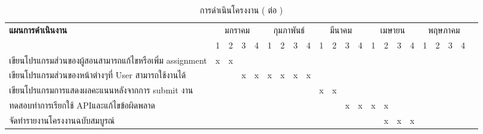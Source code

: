 \begin{landscape}
\begin{table}[h!]
\begin{threeparttable}
\begin{tabular}{|l|c|c|c|c|c|c|c|c|c|c|c|c|c|c|c|c|c|c|c|c|c|}
    \hline
    \multirow{2}{*}{\textbf{แผนการดำเนินงาน}}
    & \multicolumn{4}{c|}{มกราคม} 
    & \multicolumn{4}{c|}{กุมภาพันธ์} 
    & \multicolumn{4}{c|}{มีนาคม}
    & \multicolumn{4}{c|}{เมษายน}
    & \multicolumn{4}{c|}{พฤษภาคม}\\
    \cline{2-21}
    & 1 & 2 & 3 & 4
    & 1 & 2 & 3 & 4
    & 1 & 2 & 3 & 4
    & 1 & 2 & 3 & 4
    & 1 & 2 & 3 & 4\\
	\hline
    เขียนโปรแกรมส่วนของผู้สอนสามารถแก้ไขหรือเพิ่ม assignment &x&x&&&&&&&&&&&&&&&&&&\\
    \hline
    เขียนโปรแกรมส่วนของหน้าต่างๆที่ User สามารถใช้งานได้ &&&x&x&x&x&x&x&&&&&&&&&&&&\\
    \hline
    เขียนโปรแกรมการแสดงผลคะแนนหลังจากการ submit งาน &&&&&&&&&x&x&&&&&&&&&&\\    
    \hline
    ทดสอบทำการเรียกใช้ APIและแก้ไขข้อผิดพลาด &&&&&&&&&&&x&x&x&x&&&&&&\\
    \hline 
    จัดทำรายงานโครงงานฉบับสมบูรณ์ &&&&&&&&&&&&&&x&x&x&&&&\\
    \hline
   
  \end{tabular}
  \caption{การดำเนินโครงงาน ( ต่อ )}
  \end{threeparttable}
  \label{table:table2}
  
  
  
\end{table}
\end{landscape}